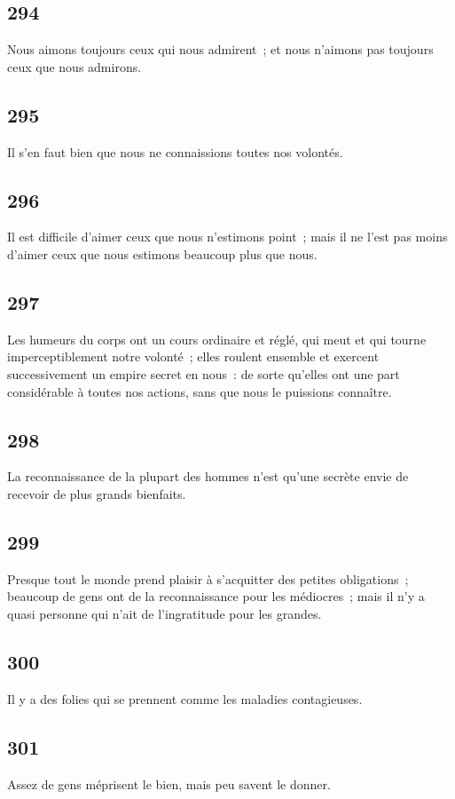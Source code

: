 \documentclass[french,twoside]{book} %
\begin{document}
\subsection[{294}]{ \textsc{294} }
\noindent Nous aimons toujours ceux qui nous admirent ; et nous n’aimons pas toujours ceux que nous admirons.
\subsection[{295}]{ \textsc{295} }
\noindent Il s’en faut bien que nous ne connaissions toutes nos volontés.
\subsection[{296}]{ \textsc{296} }
\noindent Il est difficile d’aimer ceux que nous n’estimons point ; mais il ne l’est pas moins d’aimer ceux que nous estimons beaucoup plus que nous.
\subsection[{297}]{ \textsc{297} }
\noindent Les humeurs du corps ont un cours ordinaire et réglé, qui meut et qui tourne imperceptiblement notre volonté ; elles roulent ensemble et exercent successivement un empire secret en nous : de sorte qu’elles ont une part considérable à toutes nos actions, sans que nous le puissions connaître.
\subsection[{298}]{ \textsc{298} }
\noindent La reconnaissance de la plupart des hommes n’est qu’une secrète envie de recevoir de plus grands bienfaits.
\subsection[{299}]{ \textsc{299} }
\noindent Presque tout le monde prend plaisir à s’acquitter des petites obligations ; beaucoup de gens ont de la reconnaissance pour les médiocres ; mais il n’y a quasi personne qui n’ait de l’ingratitude pour les grandes.
\subsection[{300}]{ \textsc{300} }
\noindent Il y a des folies qui se prennent comme les maladies contagieuses.
\subsection[{301}]{ \textsc{301} }
\noindent Assez de gens méprisent le bien, mais peu savent le donner.
\end{document}
